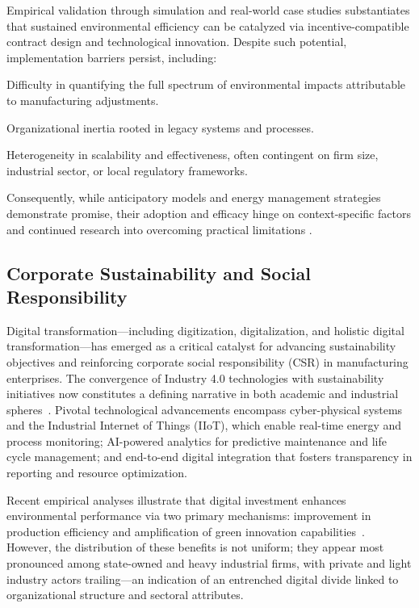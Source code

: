 \documentclass[sigconf]{acmart}
\begin{document}
Empirical validation through simulation and real-world case studies substantiates that sustained environmental efficiency can be catalyzed via incentive-compatible contract design and technological innovation. Despite such potential, implementation barriers persist, including:

Difficulty in quantifying the full spectrum of environmental impacts attributable to manufacturing adjustments.

Organizational inertia rooted in legacy systems and processes.

Heterogeneity in scalability and effectiveness, often contingent on firm size, industrial sector, or local regulatory frameworks.

Consequently, while anticipatory models and energy management strategies demonstrate promise, their adoption and efficacy hinge on context-specific factors and continued research into overcoming practical limitations \cite{ref80}.

\subsection{Corporate Sustainability and Social Responsibility}

Digital transformation—including digitization, digitalization, and holistic digital transformation—has emerged as a critical catalyst for advancing sustainability objectives and reinforcing corporate social responsibility (CSR) in manufacturing enterprises. The convergence of Industry 4.0 technologies with sustainability initiatives now constitutes a defining narrative in both academic and industrial spheres~\cite{ref16}\cite{ref18}\cite{ref26}\cite{ref27}\cite{ref29}\cite{ref40}\cite{ref41}\cite{ref42}\cite{ref43}. Pivotal technological advancements encompass cyber-physical systems and the Industrial Internet of Things (IIoT), which enable real-time energy and process monitoring; AI-powered analytics for predictive maintenance and life cycle management; and end-to-end digital integration that fosters transparency in reporting and resource optimization.

Recent empirical analyses illustrate that digital investment enhances environmental performance via two primary mechanisms: improvement in production efficiency and amplification of green innovation capabilities~\cite{ref41}. However, the distribution of these benefits is not uniform; they appear most pronounced among state-owned and heavy industrial firms, with private and light industry actors trailing—an indication of an entrenched digital divide linked to organizational structure and sectoral attributes.
\end{document}
